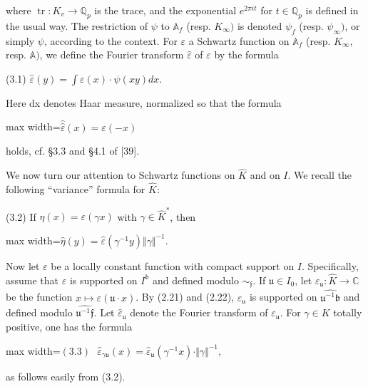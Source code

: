 \documentclass[11pt]{article}
\newcommand{\DFormula}[1]{\par\smallskip\noindent\begin{adjustbox}{max width=\linewidth}$\displaystyle #1$\end{adjustbox}\par\smallskip}
\begin{document}
where \(\operatorname{tr}:K_{v}\to \mathbb{Q}_{p}\) is the trace, and the exponential \(e^{2\pi it}\) for \(t\in \mathbb{Q}_{p}\) is defined in the usual way. The restriction of \(\psi \) to \(𝔸_{f}\) (resp. \(K_{\infty })\) is denoted \(\psi _{f}\) (resp. \(\psi _{\infty })\), or simply \(\psi \), according to the context. For \(\varepsilon \) a Schwartz function on \(𝔸_{f}\) (resp. \(K_{\infty }\), resp. \(𝔸)\), we define the Fourier transform \(\widehat{\varepsilon }\) of \(\varepsilon \) by the formula\par
\par
(3.1)    \(\widehat{\varepsilon }(y)=\int \varepsilon (x)\cdot \psi (xy)dx\).\par
\par
Here dx denotes Haar measure, normalized so that the formula\par
\par
\DFormula{\widehat{\widehat{\varepsilon }}(x)=\varepsilon (-x)}
\par
holds, cf. §3.3 and §4.1 of [39].\par
\par
We now turn our attention to Schwartz functions on \(\widehat{K}\) and on \(I\). We recall the following “variance” formula for \(\widehat{K}\):\par
\par
(3.2) If \(\eta (x)=\varepsilon (\gamma x)\) with \(\gamma \in \widehat{K}^{\ast}\), then\par
\par
\DFormula{\widehat{\eta }(y)=\widehat{\varepsilon }(\gamma ^{-1}y)\Vert \gamma \Vert ^{-1}.}
\par
Now let \(\varepsilon \) be a locally constant function with compact support on \(I\). Specifically, assume that \(\varepsilon \) is supported on \(I^{𝔟}\) and defined modulo \(\sim _{𝔣}\). If \(𝔲\in I_{0}\), let \(\varepsilon _{𝔲}:\widehat{K}\to \mathbb{C}\) be the function \(x\mapsto \varepsilon (𝔲\cdot x)\). By (2.21) and (2.22), \(\varepsilon _{𝔲}\) is supported on \(\widehat{𝔲^{-1}𝔟}\) and defined modulo \(\widehat{𝔲^{-1}𝔣}\). Let \(\widehat{\varepsilon }_{𝔲}\) denote the Fourier transform of \(\varepsilon _{𝔲}\). For \(\gamma \in K\) totally positive, one has the formula\par
\par
\DFormula{(3.3)\,\,\,\,\widehat{\varepsilon }_{\gamma 𝔲}(x)=\widehat{\varepsilon }_{𝔲}(\gamma ^{-1}x)\cdot \Vert \gamma \Vert ^{-1},}
\par
as follows easily from (3.2).\par
\end{document}
